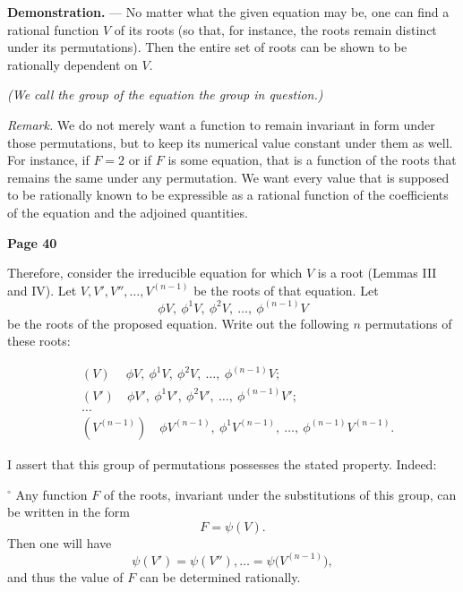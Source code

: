 \documentclass{article}
\begin{document}
\medskip

\noindent
\textbf{Demonstration.} --- No matter what the given equation may be, one can find a rational function \(V\) of its roots (so that, for instance, the roots remain distinct under its permutations). Then the entire set of roots can be shown to be rationally dependent on \(V\).

\medskip

\noindent
\emph{(We call the group of the equation the group in question.)}

\smallskip

\noindent
\emph{Remark.} We do not merely want a function to remain invariant in form under those permutations, but to keep its numerical value constant under them as well. For instance, if \(F = 2\) or if \(F\) is some equation, that is a function of the roots that remains the same under any permutation. We want every value that is supposed to be rationally known to be expressible as a rational function of the coefficients of the equation and the adjoined quantities.

\bigskip

\noindent
\textbf{Page 40}

\medskip

\noindent
Therefore, consider the irreducible equation for which \(V\) is a root (Lemmas III and IV). Let \(V, V', V'', \dots, V^{(n-1)}\) be the roots of that equation. Let
\[
\phi V,\ \phi^1 V,\ \phi^2 V,\ \dots,\ \phi^{(n-1)} V
\]
be the roots of the proposed equation. Write out the following \(n\) permutations of these roots:

\[
\begin{aligned}
&(V)\quad\ \phi V,\ \phi^1 V,\ \phi^2 V,\ \dots,\ \phi^{(n-1)} V; \\
&(V')\quad \phi V',\ \phi^1 V',\ \phi^2 V',\ \dots,\ \phi^{(n-1)} V'; \\
&\dots \\
&(V^{(n-1)})\quad \phi V^{(n-1)},\ \phi^1 V^{(n-1)},\ \dots,\ \phi^{(n-1)}V^{(n-1)}.
\end{aligned}
\]

\noindent
I assert that this group of permutations possesses the stated property. Indeed:

\smallskip

\(^\circ\) Any function \(F\) of the roots, invariant under the substitutions of this group, can be written in the form
\[
F = \psi(V).
\]
Then one will have
\[
\psi(V') = \psi(V''), \dots = \psi\bigl(V^{(n-1)}\bigr),
\]
and thus the value of \(F\) can be determined rationally.
\end{document}
